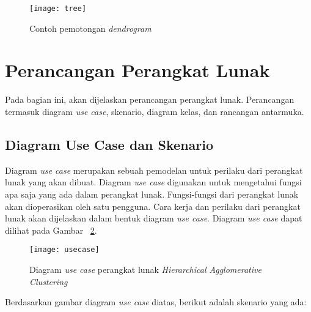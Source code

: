 \begin{figure}[H]
    \centering  
    \texttt{[image: tree]}  
    \caption[Contoh pemotongan \textit{dendrogram}]{Contoh pemotongan \textit{dendrogram}} 
    \label{fig:tree} 
\end{figure}


 

\section{Perancangan Perangkat Lunak}

Pada bagian ini, akan dijelaskan perancangan perangkat lunak.  Perancangan termasuk diagram \textit{use case}, skenario, diagram kelas, dan rancangan antarmuka. 


\subsection{Diagram Use Case dan Skenario}

Diagram \textit{use case} merupakan sebuah pemodelan untuk perilaku dari perangkat lunak yang akan dibuat. Diagram \textit{use case} digunakan untuk mengetahui fungsi apa saja yang ada dalam perangkat lunak. Fungsi-fungsi dari perangkat lunak akan dioperasikan oleh satu pengguna. Cara kerja dan perilaku dari perangkat lunak akan dijelaskan dalam bentuk diagram \textit{use case}. Diagram \textit{use case} dapat dilihat pada Gambar ~\ref{fig:usecase}.

\begin{figure}[H]
    \centering  
    \texttt{[image: usecase]}  
    \caption[Diagram \textit{use case} perangkat lunak \textit{Hierarchical Agglomerative Clustering}]{Diagram \textit{use case} perangkat lunak \textit{Hierarchical Agglomerative Clustering}} 
    \label{fig:usecase} 
\end{figure}

Berdasarkan gambar diagram \textit{use case} diatas, berikut adalah skenario yang ada:

